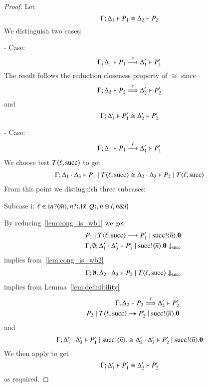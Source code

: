\begin{proof}
	\noi Let
	\[
		\Gamma; \Delta_1 \vdash P_1 \cong \Delta_2 \vdash P_2
	\]
	\noi We distinguish two cases:

	\noi - Case:
	\[
		\Gamma; \Delta_1 \vdash P_1 \stackrel{\tau}{\longrightarrow} \Delta_1' \vdash P_1'
	\]
	\noi The result follows the reduction closeness property of $\cong$ since
	\[
		\Gamma; \Delta_2 \vdash P_2 \stackrel{\tau}{\Longrightarrow} \Delta_2' \vdash P_2'
	\]
	\noi and
	\[
		\Gamma; \Delta_1' \vdash P_1' \cong \Delta_2' \vdash P_2'
	\]

	\noi - Case:
%
	\begin{eqnarray}
		\Gamma; \Delta_1 \vdash P_1 \stackrel{\ell}{\longrightarrow} \Delta_1' \vdash P_1'
		\label{lem:cong_is_wb1}
	\end{eqnarray}
%
	\noi We choose test $T\langle \ell, \textrm{succ} \rangle$ to get
%
	\begin{eqnarray}
		\Gamma; \Delta_1 \cdot \Delta_3 \vdash P_1 \;|\; T\langle \ell, \textrm{succ} \rangle \cong \Delta_2 \cdot \Delta_3 \vdash P_2 \;|\; T\langle \ell, \textrm{succ} \rangle
		\label{lem:cong_is_wb2}
	\end{eqnarray}
%
	\noi From this point we distinguish three subcases:

	\noi Subcase i: $\ell \in \{n ? \langle \tilde{m} \rangle, n ? \langle \lambda \tilde{x}.\,Q \rangle, n \oplus l, n \& l\}$

	\noi By reducing~\ref{lem:cong_is_wb1} we get
%
	\begin{eqnarray*}
		&& P_1 \;|\; T\langle \ell, \textrm{succ} \rangle \longrightarrow P_1' \;|\; \textrm{succ} ! \langle \overline{n} \rangle . \mathbf{0} \\
		&& \Gamma; \emptyset; \Delta_1' \cdot \Delta_3' \vdash P_1' \;|\; \textrm{succ} ! \langle \overline{n} \rangle . \mathbf{0} \downarrow_{\textrm{succ}}
	\end{eqnarray*}
%
	\noi implies from~\ref{lem:cong_is_wb2}
%
	\begin{eqnarray*}
		&& \Gamma; \emptyset; \Delta_2 \cdot \Delta_3 \vdash P_2 \;|\; T\langle \ell, \textrm{succ} \rangle \Downarrow_{\textrm{succ}}
	\end{eqnarray*}
%
	\noi implies from Lemma~\ref{lem:definibility}
%
	\begin{eqnarray*}
		&& \Gamma; \Delta_2 \vdash P_2 \stackrel{\ell}{\Longrightarrow} \Delta_2' \vdash P_2'\\
		&& P_2 \;|\; T \langle \ell, \textrm{succ} \rangle \rightarrow\!\!\!\!\!\rightarrow P_2' \;|\; \textrm{succ} ! \langle \overline{n} \rangle . \mathbf{0}
	\end{eqnarray*}
%
	\noi and
%
	\[
		\Gamma; \Delta_1' \cdot \Delta_3' \vdash P_1' \;|\; \textrm{succ} ! \langle \overline{n} \rangle . \cong \Delta_2' \cdot \Delta_3' \vdash P_2' \;|\; \textrm{succ} ! \langle \overline{n} \rangle . \mathbf{0}
	\]
	We then apply  to get
%
	\[
		\Gamma; \Delta_1' \vdash P_1' \cong \Delta_2' \vdash P_2'
	\]
%
	\noi as required.


\end{proof}
